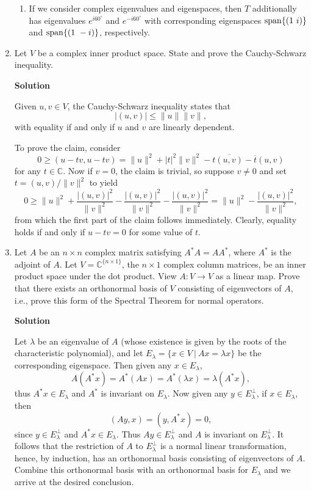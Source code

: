 \documentclass{article}
\def\span{\mathop{\rm span}\nolimits}
\begin{document}
\begin{enumerate}
\begin{enumerate}
\item If we consider complex eigenvalues and eigenspaces, then \(T\) additionally has eigenvalues \(e^{i 60^{\circ}}\) and \(e^{-i 60^{\circ}}\) with corresponding eigenspaces \(\span \{(1 \ i)\}\) and \(\span \{(1 \ -i)\}\), respectively.

\end{enumerate}



\item Let \(V\) be a complex inner product space.  State and prove the Cauchy-Schwarz inequality.

{\bf Solution}

Given \(u,v \in V\), the Cauchy-Schwarz inequality states that
\[|(u,v)| \leq \|u\| \|v\|,\]
with equality if and only if \(u\) and \(v\) are linearly dependent.

To prove the claim, consider
\[0 \geq (u - tv, u - tv) = \|u\|^2 + |t|^2 \|v\|^2 - t\overline{(u,v)} - \overline{t}(u,v)\]
for any \(t \in \mathbb{C}\).  Now if \(v = 0\), the claim is trivial, so suppose \(v \neq 0\) and set \(t = (u,v) / \|v\|^2\) to yield
\[0 \geq \|u\|^2 + \frac{|(u,v)|^2}{\|v\|^2} - \frac{|(u,v)|^2}{\|v\|^2} - \frac{|(u,v)|^2}{\|v\|^2}
       = \|u\|^2 - \frac{|(u,v)|^2}{\|v\|^2},\]
from which the first part of the claim follows immediately.  Clearly, equality holds if and only if \(u - tv = 0\) for some value of \(t\).



\item Let \(A\) be an \(n \times n\) complex matrix satisfying \(A^*A = AA^*\), where \(A^*\) is the adjoint of \(A\).  Let \(V = \mathbb{C}^{\{n \times 1\}}\), the \(n \times 1\) complex column matrices, be an inner product space under the dot product.  View \(A : V \to V\) as a linear map.  Prove that there exists an orthonormal basis of \(V\) consisting of eigenvectors of \(A\), i.e., prove this form of the Spectral Theorem for normal operators.

{\bf Solution}

Let \(\lambda\) be an eigenvalue of \(A\) (whose existence is given by the roots of the characteristic polynomial), and let \(E_{\lambda} = \{x \in V \ | \ A x = \lambda x\}\) be the corresponding eigenspace.  Then given any \(x \in E_{\lambda}\),
\[A(A^*x) = A^*(Ax) = A^*(\lambda x) = \lambda (A^*x),\]
thus \(A^*x \in E_{\lambda}\) and \(A^*\) is invariant on \(E_{\lambda}\).  Now given any \(y \in E_{\lambda}^{\perp}\), if \(x \in E_{\lambda}\), then
\[(Ay,x) = (y,A^*x) = 0,\]
since \(y \in E_{\lambda}^{\perp}\) and \(A^*x \in E_{\lambda}\).  Thus \(Ay \in E_{\lambda}^{\perp}\) and \(A\) is invariant on \(E_{\lambda}^{\perp}\).  It follows that the restriction of \(A\) to \(E_{\lambda}^{\perp}\) is a normal linear transformation, hence, by induction, has an orthonormal basis consisting of eigenvectors of \(A\).  Combine this orthonormal basis with an orthonormal basis for \(E_{\lambda}\) and we arrive at the desired conclusion.



\end{enumerate}
\end{document}
